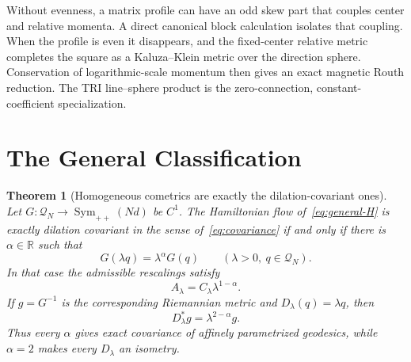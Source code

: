 \documentclass[11pt]{article}
\newtheorem{theorem}{Theorem}
\newcommand{\R}{\mathbb{R}}
\newcommand{\Q}{\mathcal{Q}}
\begin{document}
Without evenness, a matrix profile can have an odd skew part that couples
center and relative momenta.  A direct canonical block calculation isolates
that coupling.  When the profile is even it disappears, and the
fixed-center relative metric completes the square as a Kaluza--Klein metric
over the direction sphere.  Conservation of logarithmic-scale momentum then
gives an exact magnetic Routh reduction.  The TRI line--sphere product is the
zero-connection, constant-coefficient specialization.

\section*{The General Classification}

\begin{theorem}[Homogeneous cometrics are exactly the dilation-covariant ones]
\label{thm:general}
Let \(G:\Q_N\to\operatorname{Sym}_{++}(Nd)\) be \(C^1\).  The Hamiltonian
flow of~\eqref{eq:general-H} is exactly dilation covariant in the sense
of~\eqref{eq:covariance} if and only if there is \(\alpha\in\R\) such that
\begin{equation}
 G(\lambda q)=\lambda^\alpha G(q)
 \qquad(\lambda>0,\ q\in\Q_N).
 \label{eq:Ghom}
\end{equation}
In that case the admissible rescalings satisfy
\[
 A_\lambda=C_\lambda\lambda^{1-\alpha}.
\]
If \(g=G^{-1}\) is the corresponding Riemannian metric and
\(D_\lambda(q)=\lambda q\), then
\begin{equation}
 D_\lambda^*g=\lambda^{2-\alpha}g.
 \label{eq:homothety}
\end{equation}
Thus every \(\alpha\) gives exact covariance of affinely parametrized
geodesics, while \(\alpha=2\) makes every \(D_\lambda\) an isometry.
\end{theorem}
\end{document}
